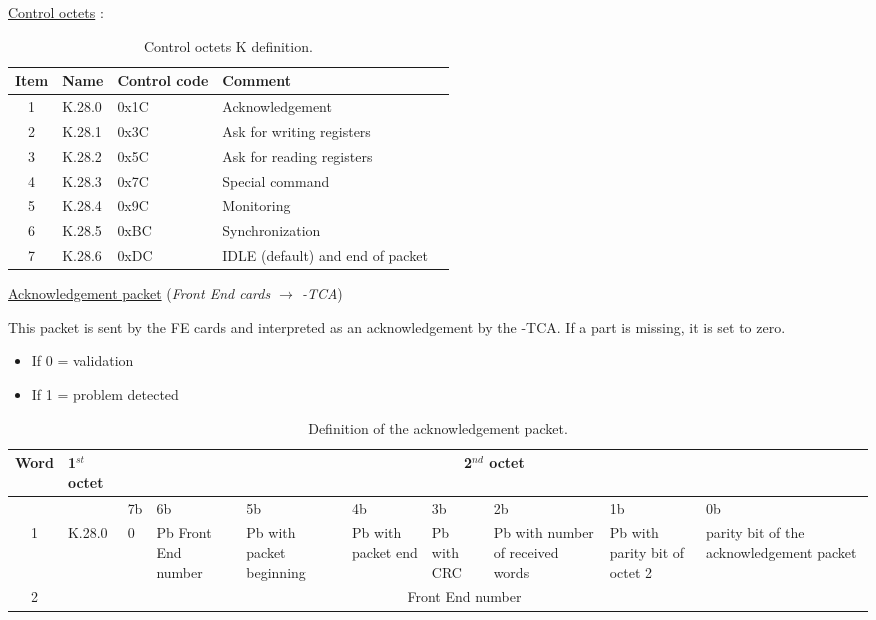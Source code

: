 \underline{Control octets} :

\begin{table} [!htbp]
  \centering
  \caption{Control octets K definition.}
\begin{tabular}{|c|p{4cm}|p{4cm}|p{4cm}|p{4cm}|}
\hline
\bf{Item}  			& 		\bf{Name}		& \bf{Control code}	& \bf{Comment}\\
\hline
1				&	K.28.0			&	0x1C			& Acknowledgement	\\
2				&	K.28.1			&	0x3C			& Ask for writing registers	\\
3				&	K.28.2			&	0x5C			& Ask for reading registers	\\
4				&	K.28.3			&	0x7C			& Special command	\\
5				&	K.28.4			&	0x9C			& Monitoring	\\
6				&	K.28.5			&	0xBC		& Synchronization	\\
7				&	K.28.6			&	0xDC		& IDLE (default) and end of packet\\
\hline
\end{tabular}
\end{table}


\underline{Acknowledgement packet} (\textit{Front End cards $\rightarrow$ {\charmu-TCA}})\newline

This packet is sent by the FE cards and interpreted as an acknowledgement by the \charmu-TCA. If a part is missing, it is set to zero.
\begin{itemize}
	\item If 0 = validation
	\item If 1 = problem detected
\end{itemize}


\begin{table} [!htbp]
  \centering
  \caption{Definition of the acknowledgement packet.}
\begin{tabular}{|c|p{1.5cm}|p{0.5cm}|p{1cm}|p{1cm}|p{1cm}|p{1cm}|p{1cm}|p{2cm}|p{2cm}|}
\hline
\bf{Word}  			& 		\bf{1$^{st}$ octet}		& \multicolumn{8}{c|}{\bf{2$^{nd}$ octet}} 	\\
\hline
					&						& 7b & 6b& 5b&4b&3b&2b&1b&0b \\
					\cline{3-10}
1				&	K.28.0			&	0	& Pb Front End number & Pb with packet beginning & Pb with packet end & Pb with CRC & Pb with number of received words &  Pb with parity bit of octet 2 & parity bit of the acknowledgement packet	\\
\hline
2				& \multicolumn{9}{c|}{Front End number}\\
\hline
\end{tabular}
\end{table}

